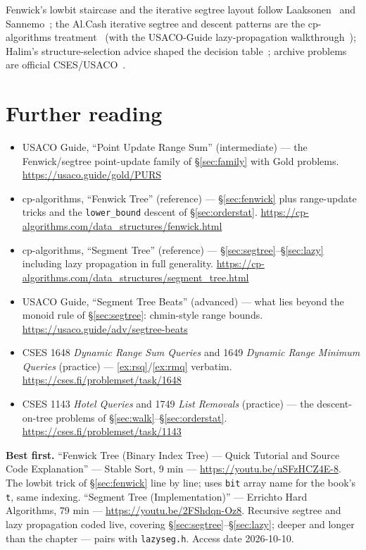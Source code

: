 \chapternotes
Fenwick's lowbit staircase and the iterative segtree layout follow
Laaksonen~\cite{laaksonen2024} and Sannemo~\cite{sannemo2025}; the
Al.Cash iterative segtree and descent patterns are the
cp-algorithms treatment~\cite{cpalgorithms} (with the
USACO-Guide lazy-propagation walkthrough~\cite{usacoguide}); Halim's
structure-selection advice shaped the decision
table~\cite{halimcp4}; archive problems are official
CSES/USACO~\cite{cses}.

\section*{Further reading}
\begin{itemize}
\item USACO Guide, ``Point Update Range Sum'' (intermediate) --- the Fenwick/segtree
point-update family of \S\ref{sec:family} with Gold problems. \newline\url{https://usaco.guide/gold/PURS}
\item cp-algorithms, ``Fenwick Tree'' (reference) ---
\S\ref{sec:fenwick} plus range-update tricks and the
\texttt{lower\_bound} descent of \S\ref{sec:orderstat}. \newline\url{https://cp-algorithms.com/data_structures/fenwick.html}
\item cp-algorithms, ``Segment Tree'' (reference) ---
\S\ref{sec:segtree}--\S\ref{sec:lazy} including lazy propagation in
full generality. \newline\url{https://cp-algorithms.com/data_structures/segment_tree.html}
\item USACO Guide, ``Segment Tree Beats'' (advanced) --- what lies beyond the
monoid rule of \S\ref{sec:segtree}: chmin-style range bounds. \newline\url{https://usaco.guide/adv/segtree-beats}
\item CSES 1648 \emph{Dynamic Range Sum Queries} and 1649
\emph{Dynamic Range Minimum Queries} (practice) ---
\ref{ex:rsq}/\ref{ex:rmq} verbatim. \newline\url{https://cses.fi/problemset/task/1648}
\item CSES 1143 \emph{Hotel Queries} and 1749 \emph{List Removals}
(practice) --- the
descent-on-tree problems of \S\ref{sec:walk}--\S\ref{sec:orderstat}. \newline\url{https://cses.fi/problemset/task/1143}\end{itemize}

\begin{rulebox}
\smallskip\noindent\textbf{Best first.}
``Fenwick Tree (Binary Index Tree) --- Quick Tutorial and Source Code
Explanation'' --- Stable Sort, 9 min ---
\url{https://youtu.be/uSFzHCZ4E-8}. The lowbit trick
of \S\ref{sec:fenwick} line by line; uses \texttt{bit} array name for
the book's \texttt{t}, same indexing.
\smallskip\noindent
``Segment Tree (Implementation)'' --- Errichto Hard Algorithms,
79 min --- \url{https://youtu.be/2FShdqn-Oz8}.
Recursive segtree and lazy propagation coded live, covering
\S\ref{sec:segtree}--\S\ref{sec:lazy}; deeper and longer than the
chapter --- pairs with \texttt{lazyseg.h}. Access date 2026-10-10.
\end{rulebox}
